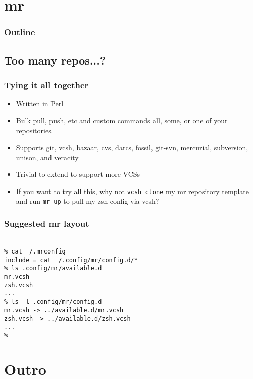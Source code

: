 \documentclass[t]{beamer}
\begin{document}
\section{mr}

\begin{frame}
	\frametitle{Outline}
	\tableofcontents[currentsection]
\end{frame}

\subsection{Too many repos...?}

\begin{frame}
	\frametitle{Tying it all together}
	\begin{itemize}
		\item Written in Perl
		\item Bulk pull, push, etc and custom commands all, some, or one of your repositories
		\item Supports git, vcsh, bazaar, cvs, darcs, fossil, git-svn, mercurial, subversion, unison, and veracity
		\item Trivial to extend to support more VCSs
		\item If you want to try all this, why not \texttt{vcsh clone} my mr repository template and run \texttt{mr up} to pull my zsh config via vcsh?
	\end{itemize}
\end{frame}

\begin{frame}
	\frametitle{Suggested mr layout}
	\texttt{ \\
		\% cat ~/.mrconfig \\
		include = cat ~/.config/mr/config.d/* \\
		\% ls .config/mr/available.d \\
		mr.vcsh \\
		zsh.vcsh \\
		... \\
		\% ls -l .config/mr/config.d \\
		mr.vcsh -> ../available.d/mr.vcsh \\
		zsh.vcsh -> ../available.d/zsh.vcsh \\
		... \\
		\%
	}
\end{frame}


\section{Outro}
\end{document}
